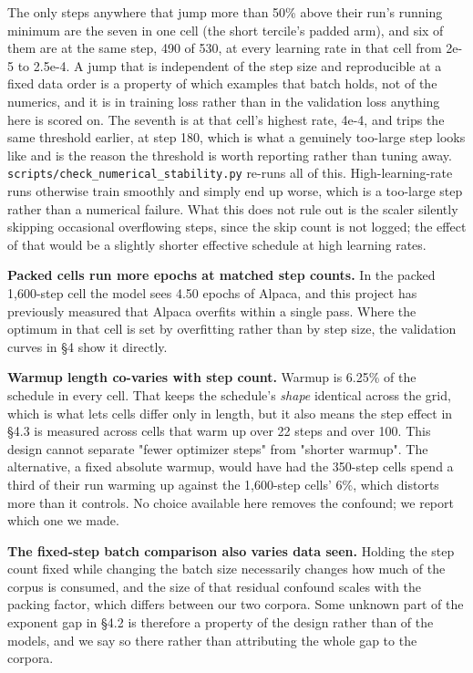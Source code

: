 \documentclass[11pt]{article}
\begin{document}
The only steps anywhere that jump more than 50\% above their run's running minimum are the seven in one cell (the short tercile's padded arm), and six of them are at the same step, 490 of 530, at every learning rate in that cell from 2e-5 to 2.5e-4. A jump that is independent of the step size and reproducible at a fixed data order is a property of which examples that batch holds, not of the numerics, and it is in training loss rather than in the validation loss anything here is scored on. The seventh is at that cell's highest rate, 4e-4, and trips the same threshold earlier, at step 180, which is what a genuinely too-large step looks like and is the reason the threshold is worth reporting rather than tuning away. \texttt{scripts/\allowbreak{}check\_\allowbreak{}numerical\_\allowbreak{}stability.py} re-runs all of this. High-learning-rate runs otherwise train smoothly and simply end up worse, which is a too-large step rather than a numerical failure. What this does not rule out is the scaler silently skipping occasional overflowing steps, since the skip count is not logged; the effect of that would be a slightly shorter effective schedule at high learning rates.

\textbf{Packed cells run more epochs at matched step counts.} In the packed 1,600-step cell the model sees 4.50 epochs of Alpaca, and this project has previously measured that Alpaca overfits within a single pass. Where the optimum in that cell is set by overfitting rather than by step size, the validation curves in \S{}4 show it directly.

\textbf{Warmup length co-varies with step count.} Warmup is 6.25\% of the schedule in every cell. That keeps the schedule's \emph{shape} identical across the grid, which is what lets cells differ only in length, but it also means the step effect in \S{}4.3 is measured across cells that warm up over 22 steps and over 100. This design cannot separate "fewer optimizer steps" from "shorter warmup". The alternative, a fixed absolute warmup, would have had the 350-step cells spend a third of their run warming up against the 1,600-step cells' 6\%, which distorts more than it controls. No choice available here removes the confound; we report which one we made.

\textbf{The fixed-step batch comparison also varies data seen.} Holding the step count fixed while changing the batch size necessarily changes how much of the corpus is consumed, and the size of that residual confound scales with the packing factor, which differs between our two corpora. Some unknown part of the exponent gap in \S{}4.2 is therefore a property of the design rather than of the models, and we say so there rather than attributing the whole gap to the corpora.
\end{document}
